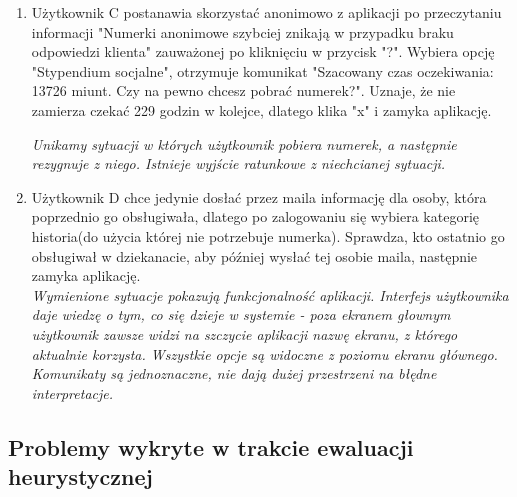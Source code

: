\documentclass[12pt]{article}
\begin{document}
\begin {enumerate}
	\textit{Komunikaty ostrzegawcze są przedstawione w prostym języku i jednoznacznie wskazują na konsekwencję danego działania; istnieje wyjście ratunkowe z niechcianej sytuacji.}\\
	
	\item Użytkownik C postanawia skorzystać anonimowo z aplikacji po przeczytaniu informacji "Numerki anonimowe szybciej znikają w przypadku braku odpowiedzi klienta" zauważonej po kliknięciu w przycisk "?". Wybiera opcję "Stypendium socjalne", otrzymuje komunikat "Szacowany czas oczekiwania: 13726 miunt. Czy na pewno chcesz pobrać numerek?". Uznaje, że nie zamierza czekać 229 godzin w kolejce, dlatego klika "x" i zamyka aplikację.
	
	\textit{Unikamy sytuacji w których użytkownik pobiera numerek, a następnie rezygnuje z niego. Istnieje wyjście ratunkowe z niechcianej sytuacji.}\\
	
	
	\item Użytkownik D chce jedynie dosłać przez maila informację dla osoby, która poprzednio go obsługiwała, dlatego po zalogowaniu się wybiera kategorię historia(do użycia której nie potrzebuje numerka). Sprawdza, kto ostatnio go obsługiwał w dziekanacie, aby później wysłać tej osobie maila, następnie zamyka aplikację.\\
	
	\textit{Wymienione sytuacje pokazują funkcjonalność aplikacji. Interfejs użytkownika daje wiedzę o tym, co się dzieje w systemie - poza ekranem głownym użytkownik zawsze widzi na szczycie aplikacji nazwę ekranu, z którego aktualnie korzysta. Wszystkie opcje są widoczne z poziomu ekranu głównego. Komunikaty są jednoznaczne, nie dają dużej przestrzeni na błędne interpretacje.}
\end{enumerate}

\subsection{Problemy wykryte w trakcie ewaluacji heurystycznej}
\end{document}
